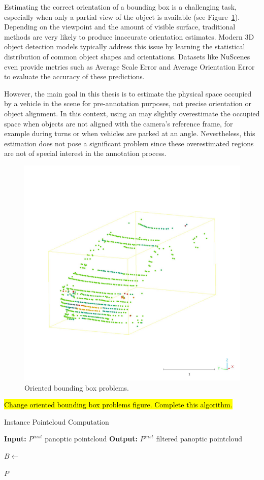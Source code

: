 Estimating the correct orientation of a bounding box is a challenging task, especially when only a partial view of the object is available (see Figure~\ref{fig:oriented_bounding_box_problems}). Depending on the viewpoint and the amount of visible surface, traditional methods are very likely to produce inaccurate orientation estimates. Modern 3D object detection models typically address this issue by learning the statistical distribution of common object shapes and orientations. Datasets like NuScenes even provide metrics such as Average Scale Error and Average Orientation Error to evaluate the accuracy of these predictions.

However, the main goal in this thesis is to estimate the physical space occupied by a vehicle in the scene for pre-annotation purposes, not precise orientation or object alignment. In this context, using an  may slightly overestimate the occupied space when objects are not aligned with the camera's reference frame, for example during turns or when vehicles are parked at an angle. Nevertheless, this estimation does not pose a significant problem since these overestimated regions are not of special interest in the annotation process.

\begin{figure}[h!]
    \centering
    \includegraphics[width=0.5\linewidth]{images/methodology/oriendet_bbox_problem_aux.jpeg}
    \caption{Oriented bounding box problems.}
    \label{fig:oriented_bounding_box_problems}
\end{figure}

\hl{Change oriented bounding box problems figure. Complete this algorithm.}
\begin{algorithm}
    \caption{Instance Pointcloud Computation}
    \label{algorithm:instance_pointcloud}
    \footnotesize

    \begin{algorithmic}[1]
        \State \textbf{Input:} $P^{inst}$ panoptic pointcloud
        \State \textbf{Output:} $P^{inst}$ filtered panoptic pointcloud
        
                \State $B \gets $
            
            \EndFor
        \EndFor
        
        \State \Return $P$
    \end{algorithmic}
\end{algorithm}

